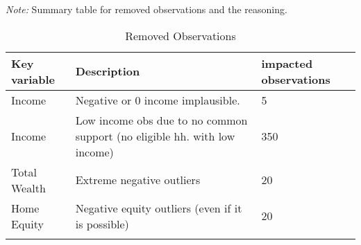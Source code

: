 \documentclass[12pt,a4paper]{article}
\begin{document}
\begin{landscape}
\begin{singlespace}
			\def\sym#1{\ifmmode^{#1}\else\(^{#1}\)\fi}
			\begin{ThreePartTable}
				\begin{TableNotes}
					\begin{scriptsize}
					\item \textit{Note:} Summary table for removed observations and the reasoning. 	
					\end{scriptsize}
				\end{TableNotes}
				
				\begin{longtable}{l C{15cm} C{5cm}}
					\caption{Removed Observations}\label{tab_drop_observations}\\
					\toprule
					Key variable & Description & impacted observations  \\
					\midrule
					Income & Negative or 0 income implausible. & 5 \\
					Income & Low income obs due to no common support (no eligible hh. with low income) & 350 \\
				 	Total Wealth & Extreme negative outliers & 20 \\
				 	Home Equity & Negative equity outliers (even if it is possible) & 20 \\
					\midrule
					\bottomrule
				\insertTableNotes \\
				\end{longtable} 

				
			\end{ThreePartTable}
\end{singlespace} 
\end{landscape}
\end{document}

